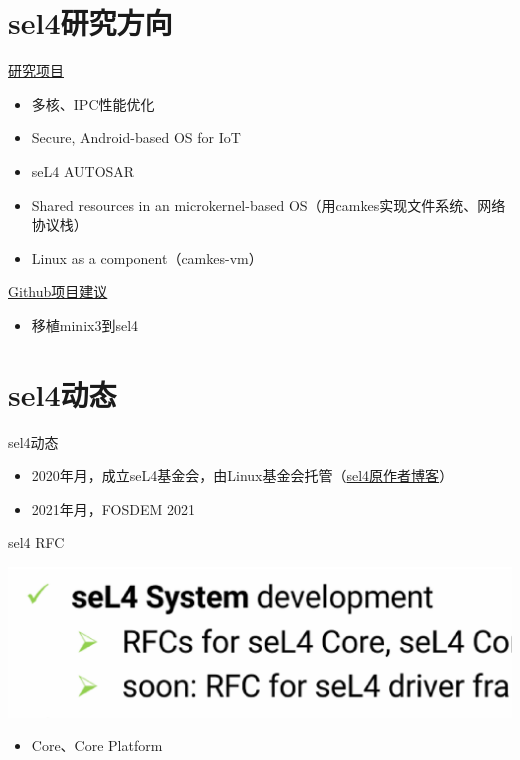 \documentclass[presentation,dvipdfmx,CJKbookmarks]{beamer}
\begin{document}
\begin{CJK*}{UTF8}{simsun}
\section{sel4\thinspace 研究方向}
\label{sec:org4e04659}
\begin{frame}[label={sec:org45ec8b6}]{\href{https://ts.data61.csiro.au/students/theses.pml.html}{研究项目}}
\begin{itemize}
\item 多核、IPC\thinspace 性能优化
\item Secure, Android-based OS for IoT
\item seL4 AUTOSAR
\item Shared resources in an microkernel-based OS（用\thinspace camkes\thinspace 实现文件系统、网络协议栈）
\item Linux as a component（camkes-vm）
\end{itemize}
\end{frame}
\begin{frame}[label={sec:org7fc68f6}]{\href{https://github.com/seL4/docs/blob/master/SuggestedProjects.md}{Github\thinspace 项目建议}}
\begin{itemize}
\item 移植\thinspace minix3\thinspace 到\thinspace sel4
\end{itemize}
\end{frame}

\section{sel4\thinspace 动态}
\label{sec:org331d134}
\begin{frame}[label={sec:orgdde232d}]{sel4\thinspace 动态}
\begin{itemize}
\item 2020\thinspace 年\thinspace 月，成立\thinspace seL4\thinspace 基金会，由\thinspace Linux\thinspace 基金会托管（\href{https://microkerneldude.wordpress.com/2020/04/07/the-sel4-foundation-what-and-why/}{sel4\thinspace 原作者博客}）
\item 2021\thinspace 年\thinspace 月，FOSDEM 2021
\end{itemize}
\end{frame}
\begin{frame}[label={sec:org8901b3d}]{sel4 RFC}
\begin{center}
\includegraphics[width=.9\linewidth]{./images/rfc-for-core.ps}
\end{center}
\begin{itemize}
\item Core、Core Platform
\end{itemize}
\end{frame}


\end{CJK*}
\end{document}
